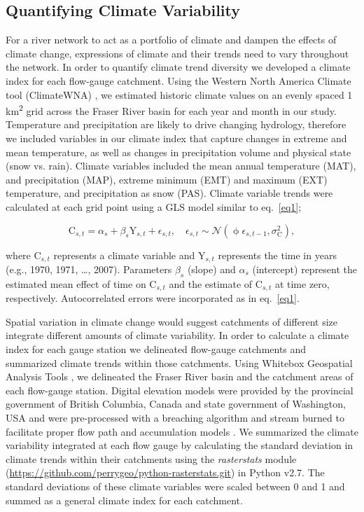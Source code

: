 \documentclass{AGUJournal}
\begin{document}
\subsection{Quantifying Climate Variability}

For a river network to act as a portfolio of climate and dampen the effects of climate change, expressions of climate and their trends need to vary throughout the network. In order to quantify climate trend diversity we developed a climate index for each flow-gauge catchment. Using the Western North America Climate tool (ClimateWNA) \citep{Wang:2016}, we estimated historic climate values on an evenly spaced 1 km\textsuperscript{2} grid across the Fraser River basin for each year and month in our study. Temperature and precipitation are likely to drive changing hydrology, therefore we included variables in our climate index that capture changes in extreme and mean temperature, as well as changes in precipitation volume and physical state (snow vs. rain). Climate variables included the mean annual temperature (MAT), and precipitation (MAP), extreme minimum (EMT) and maximum (EXT) temperature, and precipitation as snow (PAS). Climate variable trends were calculated at each grid point using a GLS model similar to eq.~\ref{eq1};
\begin{linenomath*}
\begin{equation}
	\mathrm{C}_{s,t} = \alpha_s + \beta_s \mathrm{Y}_{s,t} + \epsilon_{s,t}, \quad 
  \epsilon_{s,t} \sim \mathcal{N}(\upphi \epsilon_{s,t-1}, \sigma_\mathrm{C}^2) \label{eq2},
\end{equation}
\end{linenomath*}
where $\mathrm{C}_{s,t}$ represents a climate variable and $\mathrm{Y}_{s,t}$ represents the time in years (e.g., 1970, 1971, \ldots, 2007). Parameters $\beta_{s}$ (slope) and $\alpha_{s}$ (intercept) represent the estimated mean effect of time on $\mathrm{C}_{s,t}$ and the estimate of $\mathrm{C}_{s,t}$ at time zero, respectively. Autocorrelated errors were incorporated as in eq.~\ref{eq1}.
	
	Spatial variation in climate change would suggest catchments of different size integrate different amounts of climate variability. In order to calculate a climate index for each gauge station we delineated flow-gauge catchments and summarized climate trends within those catchments. Using Whitebox Geospatial Analysis Tools \citep{Lindsay:2016}, we delineated the Fraser River basin and the catchment areas of each flow-gauge station. Digital elevation models were provided by the provincial government of British Columbia, Canada and state government of Washington, USA and were pre-processed with a breaching algorithm and stream burned to facilitate proper flow path and accumulation models \citep{Woodrow:2016}. We summarized the climate variability integrated at each flow gauge by calculating the standard deviation in climate trends within their catchments using the \textit{rasterstats} module (\url{https://github.com/perrygeo/python-rasterstats.git}) in Python v2.7. The standard deviations of these climate variables were scaled between 0 and 1 and summed as a general climate index for each catchment.
\end{document}
